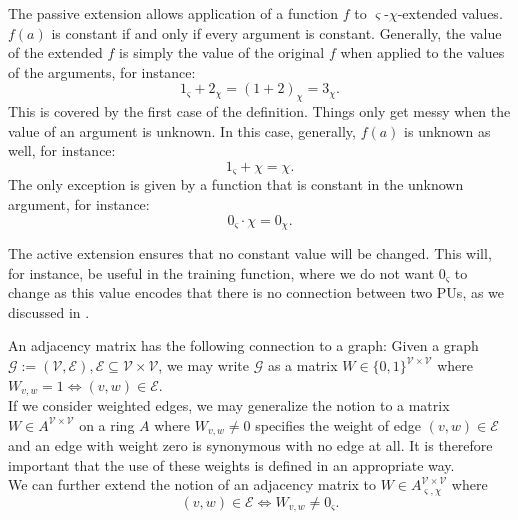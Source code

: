 \documentclass[a4paper,11pt]{report}
\newcommand{\const}{\varsigma} %
\newcommand{\var}{\chi} %
\begin{document}
\begin{Par}
The passive extension allows application of a function $f$ to $\const$-$\var$-extended values. $f(a)$ is constant if and only if every argument is constant. Generally, the value of the extended $f$ is simply the value of the original $f$ when applied to the values of the arguments, for instance:
\[
1_{\const}+2_{\var}=(1+2)_{\var}=3_{\var}.
\]
This is covered by the first case of the definition. Things only get messy when the value of an argument is unknown. In this case, generally, $f(a)$ is unknown as well, for instance:
\[
1_{\const}+\chi=\chi.
\]
The only exception is given by a function that is constant in the unknown argument, for instance:
\[
0_{\const}\cdot\chi =0_{\var}.
\]
\end{Par}

\begin{Par}
The active extension ensures that no constant value will be changed. This will, for instance, be useful in the training function, where we do not want $0_{\const}$ to change as this value encodes that there is no connection between two PUs, as we discussed in .
\end{Par}

\begin{Par}\label{par:adjacency}
An adjacency matrix has the following connection to a graph: Given a graph $\mathcal{G}:=(\mathcal{V},\mathcal{E}),\mathcal{E}\subseteq\mathcal{V}\times\mathcal{V}$, we may write $\mathcal{G}$ as a matrix $W\in\{0,1\}^{\mathcal{V}\times\mathcal{V}}$ where $W_{v,w}=1\Leftrightarrow (v,w)\in\mathcal{E}$.\\
If we consider weighted edges, we may generalize the notion to a matrix $W\in A^{\mathcal{V}\times\mathcal{V}}$ on a ring $A$ where $W_{v,w}\ne 0$ specifies the weight of edge $(v,w)\in\mathcal{E}$ and an edge with weight zero is synonymous with no edge at all. It is therefore important that the use of these weights is defined in an appropriate way.\\
We can further extend the notion of an adjacency matrix to $W\in A^{\mathcal{V}\times\mathcal{V}}_{\const,\var}$ where
\begin{equation}\label{eq:matrix-graph}
(v,w)\in\mathcal{E}\Leftrightarrow W_{v,w}\ne 0_{\const}.
\end{equation}
\end{Par}
\end{document}
